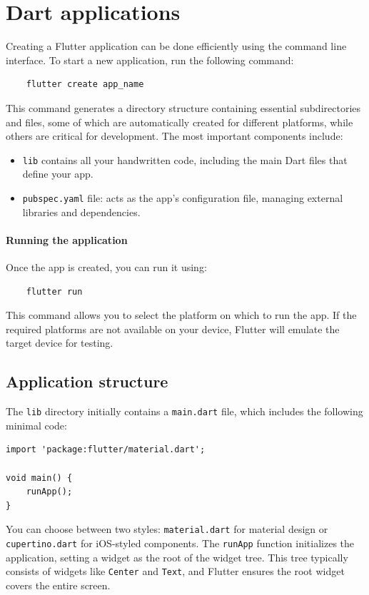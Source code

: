 \section{Dart applications}

Creating a Flutter application can be done efficiently using the command line interface.
To start a new application, run the following command:
\begin{verbatim}
    flutter create app_name
\end{verbatim}
This command generates a directory structure containing essential subdirectories and files, some of which are automatically created for different platforms, while others are critical for development. 
The most important components include:
\begin{itemize}
    \item \texttt{lib} contains all your handwritten code, including the main Dart files that define your app.
    \item \texttt{pubspec.yaml} file: acts as the app's configuration file, managing external libraries and dependencies.
\end{itemize}

\paragraph*{Running the application}
Once the app is created, you can run it using:
\begin{verbatim}
    flutter run
\end{verbatim}
This command allows you to select the platform on which to run the app. 
If the required platforms are not available on your device, Flutter will emulate the target device for testing.

\subsection{Application structure}
The \texttt{lib} directory initially contains a \texttt{main.dart} file, which includes the following minimal code:
\begin{verbatim}
import 'package:flutter/material.dart';
    
void main() {
    runApp();
}
\end{verbatim}
You can choose between two styles: \texttt{material.dart} for material design or \texttt{cupertino.dart} for iOS-styled components.
The \texttt{runApp} function initializes the application, setting a widget as the root of the widget tree.
This tree typically consists of widgets like \texttt{Center} and \texttt{Text}, and Flutter ensures the root widget covers the entire screen.

